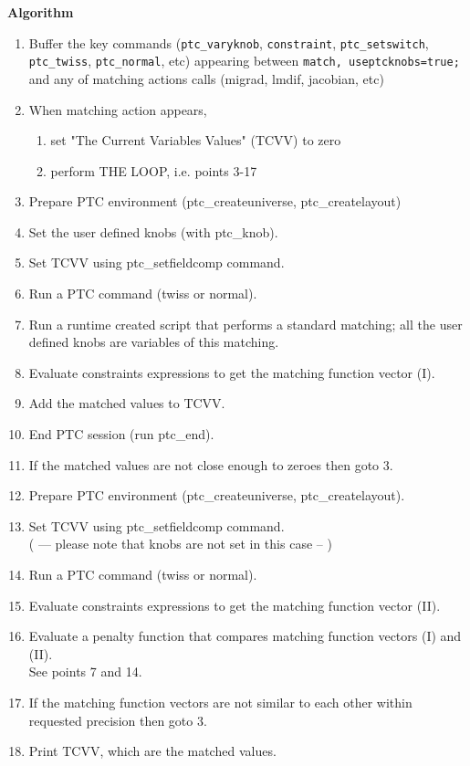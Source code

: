 \textbf{Algorithm}\\
\begin{enumerate}
   \item Buffer the key commands (\texttt{ptc\_varyknob},
     \texttt{constraint}, \texttt{ptc\_setswitch}, \texttt{ptc\_twiss},
     \texttt{ptc\_normal}, etc) appearing between \texttt{match,
       useptcknobs=true;} and any of matching actions calls
     (migrad, lmdif, jacobian, etc)
   \item  When matching action appears,
     \begin{enumerate}
       \item set "The Current Variables Values" (TCVV) to zero
       \item perform THE LOOP, i.e. points 3-17
     \end{enumerate}
   \item Prepare PTC environment (ptc\_createuniverse,
     ptc\_createlayout)
   \item Set the user defined knobs (with ptc\_knob).
   \item Set TCVV using ptc\_setfieldcomp command.
   \item Run a PTC command (twiss or normal).
   \item Run a runtime created script that performs a standard matching;
     all the user defined knobs are variables of this matching.
   \item Evaluate constraints expressions to get the matching function
     vector (I).
   \item Add the matched values to TCVV.
   \item End PTC session (run ptc\_end).
   \item If the matched values are not close enough to zeroes then goto 3.
   \item Prepare PTC environment (ptc\_createuniverse,
     ptc\_createlayout).
   \item Set TCVV using ptc\_setfieldcomp command.
     \\   ( --- please note that knobs are not set in this case  -- )
   \item Run a PTC command (twiss or normal).
   \item Evaluate constraints expressions to get the matching function
     vector (II).
   \item Evaluate a penalty function that compares matching function
     vectors (I) and (II).\\     See points 7 and 14.
   \item If the matching function vectors are not similar to each other
     within requested precision then goto 3.
   \item Print TCVV, which are the matched values.
\end{enumerate}




